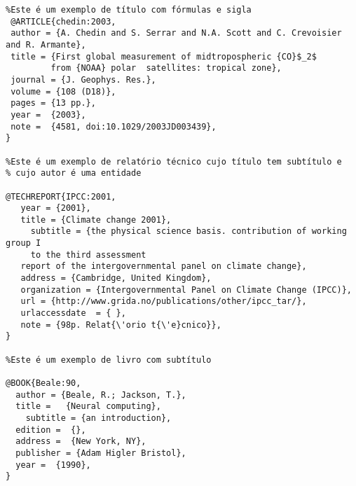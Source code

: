 \begin{verbatim}
%Este é um exemplo de título com fórmulas e sigla
 @ARTICLE{chedin:2003,
 author = {A. Chedin and S. Serrar and N.A. Scott and C. Crevoisier and R. Armante},
 title = {First global measurement of midtropospheric {CO}$_2$ 
         from {NOAA} polar	satellites: tropical zone},
 journal = {J. Geophys. Res.},
 volume = {108 (D18)},
 pages = {13 pp.},
 year =  {2003},
 note =  {4581, doi:10.1029/2003JD003439},
}

%Este é um exemplo de relatório técnico cujo título tem subtítulo e 
% cujo autor é uma entidade

@TECHREPORT{IPCC:2001,
   year = {2001},
   title = {Climate change 2001},
	 subtitle = {the physical science basis. contribution of working group I
	 to the third assessment
   report of the intergovernmental panel on climate change},
   address = {Cambridge, United Kingdom},
   organization = {Intergovernmental Panel on Climate Change (IPCC)},
   url = {http://www.grida.no/publications/other/ipcc_tar/},
   urlaccessdate  = { },  
   note = {98p. Relat{\'orio t{\'e}cnico}},
}

%Este é um exemplo de livro com subtítulo 

@BOOK{Beale:90,
  author = {Beale, R.; Jackson, T.},
  title =   {Neural computing},
	subtitle = {an introduction},
  edition =  {},
  address =  {New York, NY},
  publisher = {Adam Higler Bristol},
  year =  {1990},
}

\end{verbatim}